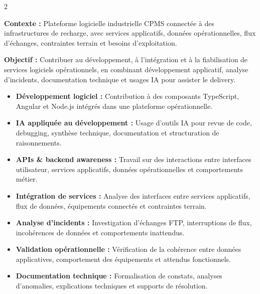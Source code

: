 \documentclass[8pt,a4paper,ragged2e,withhyper]{altacv}
\begin{document}



\makecvheader
\vspace{-0.3cm}


\begin{paracol}{2}



\textbf{Contexte :} Plateforme logicielle industrielle CPMS connectée à des infrastructures de recharge, avec services applicatifs, données opérationnelles, flux d’échanges, contraintes terrain et besoins d’exploitation.

\textbf{Objectif :} Contribuer au développement, à l’intégration et à la fiabilisation de services logiciels opérationnels, en combinant développement applicatif, analyse d’incidents, documentation technique et usages IA pour assister le delivery.

\begin{itemize}
  \item \textbf{Développement logiciel :} Contribution à des composants TypeScript, Angular et Node.js intégrés dans une plateforme opérationnelle.
  \item \textbf{IA appliquée au développement :} Usage d’outils IA pour revue de code, debugging, synthèse technique, documentation et structuration de raisonnements.
  \item \textbf{APIs \& backend awareness :} Travail sur des interactions entre interfaces utilisateur, services applicatifs, données opérationnelles et comportements métier.
  \item \textbf{Intégration de services :} Analyse des interfaces entre services applicatifs, flux de données, équipements connectés et contraintes terrain.
  \item \textbf{Analyse d’incidents :} Investigation d’échanges FTP, interruptions de flux, incohérences de données et comportements inattendus.
  \item \textbf{Validation opérationnelle :} Vérification de la cohérence entre données applicatives, comportement des équipements et attendus fonctionnels.
  \item \textbf{Documentation technique :} Formalisation de constats, analyses d’anomalies, explications techniques et supports de résolution.
\end{itemize}


\end{paracol}
\end{document}
